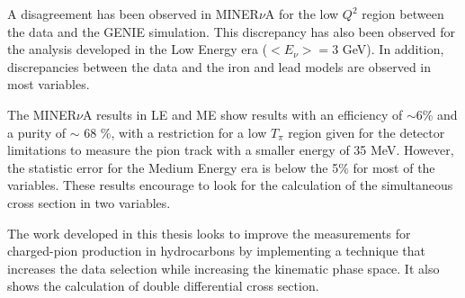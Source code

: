 A disagreement has been observed in MINER$\nu$A for the low $Q^2$ region between the data and the GENIE simulation. This discrepancy has also been observed for the analysis developed in the Low Energy era \cite{Eberly:2014mra} ($<E_\nu> = 3$ GeV). In addition, discrepancies between the data and the iron and lead models are observed in most variables.

The MINER$\nu$A results in LE and ME show results with an efficiency of $\sim$6\% and a purity of $\sim$ 68 \%, with a restriction for a low $T_\pi$ region given for the detector limitations to measure the pion track with a smaller energy of 35 MeV. However, the statistic error for the Medium Energy era is below the 5\% for most of the variables. These results encourage to look for the calculation of the simultaneous cross section in two variables. 

The work developed in this thesis looks to improve the measurements for charged-pion production in hydrocarbons by implementing a technique that increases the data selection while increasing the kinematic phase space. It also shows the calculation of double differential cross section. 